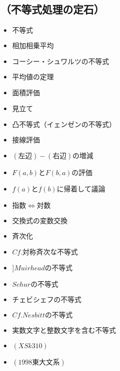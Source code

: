 \documentclass[dvipdfmx,uplatex]{jsarticle}
\begin{document}
\subsection{（不等式処理の定石）}
\begin{itemize}
	\item $ 不等式$
		\item $ 相加相乗平均$
		\item $ コーシー・シュワルツの不等式$
		\item $ 平均値の定理$
		\item $ 面積評価$
			\item $ 見立て$
		\item $ 凸不等式（イェンゼンの不等式）$
			\item $ 接線評価$
		\item $ (左辺) - (右辺) の増減$
		\item $ F(a,b) と F(b,a)の評価$
			\item $ f(a) と f(b)に帰着して議論$
				\item $ 指数⇔対数$
				\item $ 交換式の変数交換$
					\item $ 斉次化$
		\item $ Cf. 対称斉次な不等式$
			\item $ ]Muirheadの不等式$
			\item $ Schurの不等式$
			\item $ チェビシェフの不等式$
		\item $ Cf. Nesbittの不等式$
	\item $ 実数文字と整数文字を含む不等式$
		\item $  (XSk310)$
		\item $ (1998 東大文系)$
\end{itemize}
\end{document}
